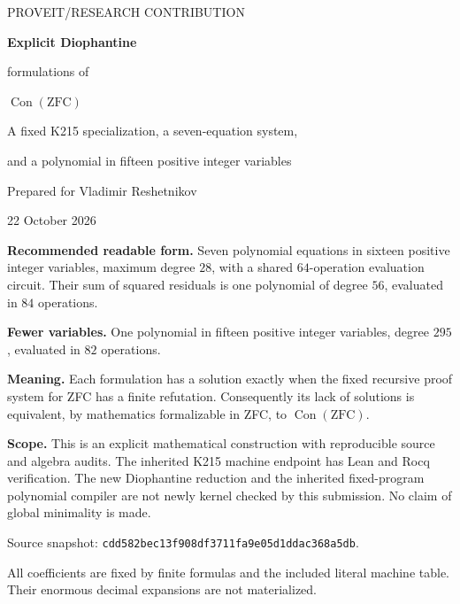\documentclass[11pt,a4paper]{article}
\theoremstyle{remark}
\newcommand{\Con}{\operatorname{Con}}
\newcommand{\ZFC}{\mathrm{ZFC}}
\newcommand{\code}[1]{\nolinkurl{#1}}
\newcommand{\commit}{\code{cdd582bec13f908df3711fa9e05d1ddac368a5db}}
\begin{document}
\hypersetup{pageanchor=false}
\begin{titlepage}
\vspace*{12mm}
{\color{MidnightBlue}\Large PROVEIT\quad /\quad RESEARCH CONTRIBUTION\par}
\vspace{14mm}
{\Huge\bfseries Explicit Diophantine\par formulations of\par $\operatorname{Con}(\mathrm{ZFC})$\par}
\vspace{9mm}
{\Large A fixed K215 specialization, a seven-equation system,\par
and a polynomial in fifteen positive integer variables\par}
\vspace{12mm}
{\large Prepared for Vladimir Reshetnikov\par 22 October 2026\par}
\vspace{12mm}
\begin{minipage}{0.96\textwidth}
\textbf{Recommended readable form.} Seven polynomial equations in sixteen
positive integer variables, maximum degree $28$, with a shared $64$-operation
evaluation circuit. Their sum of squared residuals is one polynomial of
degree $56$, evaluated in $84$ operations.

\textbf{Fewer variables.} One polynomial in fifteen positive integer
variables, degree $295$, evaluated in $82$ operations.

\textbf{Meaning.} Each formulation has a solution exactly when the fixed
recursive proof system for ZFC has a finite refutation. Consequently its
lack of solutions is equivalent, by mathematics formalizable in ZFC, to
$\Con(\ZFC)$.

\textbf{Scope.} This is an explicit mathematical construction with
reproducible source and algebra audits. The inherited K215 machine endpoint
has Lean and Rocq verification. The new Diophantine reduction and the
inherited fixed-program polynomial compiler are not newly kernel checked
by this submission. No claim of global minimality is made.
\end{minipage}
\vfill
\small Source snapshot: \commit.\par
All coefficients are fixed by finite formulas and the included literal
machine table. Their enormous decimal expansions are not materialized.
\end{titlepage}
\hypersetup{pageanchor=true}
\end{document}
